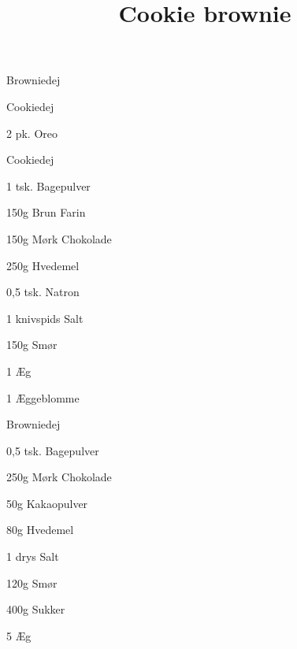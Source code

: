 \title{Cookie brownie}

\begin{ingredient}
    \begin{main}
        \item Browniedej
        \item Cookiedej
        \item 2 pk. Oreo
    \end{main}
    \begin{subingredient}{Cookiedej}
        \item 1 tsk. Bagepulver
        \item 150g Brun Farin
        \item 150g Mørk Chokolade
        \item 250g Hvedemel
        \item 0,5 tsk. Natron
        \item 1 knivspids Salt
        \item 150g Smør
        \item 1 Æg
        \item 1 Æggeblomme
    \end{subingredient}
    \begin{subingredient}{Browniedej}
        \item 0,5 tsk. Bagepulver
        \item 250g Mørk Chokolade
        \item 50g Kakaopulver
        \item 80g Hvedemel
        \item 1 drys Salt
        \item 120g Smør
        \item 400g Sukker
        \item 5 Æg
    \end{subingredient}
\end{ingredient}

